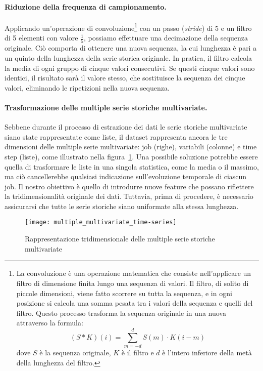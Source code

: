 \paragraph{Riduzione della frequenza di campionamento.} Applicando
un'operazione di convoluzione\footnote{La convoluzione è una operazione
    matematica che consiste nell'applicare un filtro di dimensione finita
    lungo una sequenza di valori. Il filtro, di solito di piccole dimensioni,
    viene fatto scorrere su tutta la sequenza, e in ogni posizione si calcola
    una somma pesata tra i valori della sequenza e quelli del filtro. Questo
    processo trasforma la sequenza originale in una nuova attraverso la
formula: $$(S\ast K)(i)=\displaystyle\sum_{m=-d}^{d}S(m)\cdot K(i-m)$$ dove
$S$ è la sequenza originale, $K$ è il filtro e $d$ è l'intero inferiore della
metà della lunghezza del filtro.} con un passo (\textit{stride}) di 5 e un
filtro di 5 elementi con valore $\frac{1}{5}$, possiamo effettuare una
decimazione della sequenza originale. Ciò comporta di ottenere una nuova
sequenza, la cui lunghezza è pari a un quinto della lunghezza della serie
storica originale. In pratica, il filtro calcola la media di ogni gruppo di
cinque valori consecutivi. Se questi cinque valori sono identici, il risultato
sarà il valore stesso, che sostituisce la sequenza dei cinque valori,
eliminando le ripetizioni nella nuova sequenza.

\paragraph{Trasformazione delle multiple serie storiche multivariate.} Sebbene
durante il processo di estrazione dei dati le serie storiche multivariate
siano state rappresentate come liste, il dataset rappresenta ancora le tre
dimensioni delle multiple serie multivariate: job (righe), variabili (colonne)
e time step (liste), come illustrato nella
figura~\ref{fig:multiple_multivariate_time-series}. Una possibile soluzione
potrebbe essere quella di trasformare le liste in una singola statistica, come
la media o il massimo, ma ciò cancellerebbe qualsiasi indicazione
sull'evoluzione temporale di ciascun job. Il nostro obiettivo è quello di
introdurre nuove feature che possano riflettere la tridimensionalità originale
dei dati. Tuttavia, prima di procedere, è necessario assicurarsi che tutte le
serie storiche siano uniformate alla stessa lunghezza.

\begin{figure}[!ht]
   \centering
   \texttt{[image: multiple\_multivariate\_time-series]}
   \caption{Rappresentazione tridimensionale delle multiple serie storiche
   multivariate}
   \label{fig:multiple_multivariate_time-series}
\end{figure}

